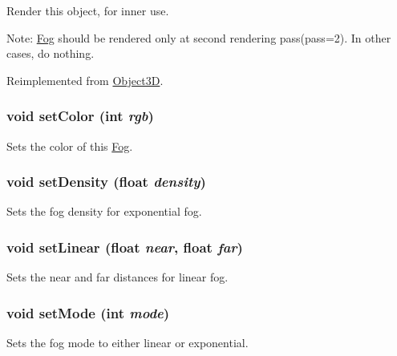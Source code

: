 Render this object, for inner use.

Note: \hyperlink{classm3g_1_1Fog}{Fog} should be rendered only at second rendering pass(pass=2). In other cases, do nothing. 

Reimplemented from \hyperlink{classm3g_1_1Object3D_1efcb1973989d9963d5bd6d03065d389}{Object3D}.\hypertarget{classm3g_1_1Fog_b1f5cc0f5cc6bbbd716a526c61f1081d}{
\subsubsection[{setColor}]{\setlength{\rightskip}{0pt plus 5cm}void setColor (int {\em rgb})}}
\label{classm3g_1_1Fog_b1f5cc0f5cc6bbbd716a526c61f1081d}


Sets the color of this \hyperlink{classm3g_1_1Fog}{Fog}. \hypertarget{classm3g_1_1Fog_0ceeda25e326e99d6e971e980a00bd49}{
\subsubsection[{setDensity}]{\setlength{\rightskip}{0pt plus 5cm}void setDensity (float {\em density})}}
\label{classm3g_1_1Fog_0ceeda25e326e99d6e971e980a00bd49}


Sets the fog density for exponential fog. \hypertarget{classm3g_1_1Fog_a46fd556865ae7f1c683c3741b68c168}{
\subsubsection[{setLinear}]{\setlength{\rightskip}{0pt plus 5cm}void setLinear (float {\em near}, \/  float {\em far})}}
\label{classm3g_1_1Fog_a46fd556865ae7f1c683c3741b68c168}


Sets the near and far distances for linear fog. \hypertarget{classm3g_1_1Fog_9f407b18ba6235cb96fa95611c1ea3a4}{
\subsubsection[{setMode}]{\setlength{\rightskip}{0pt plus 5cm}void setMode (int {\em mode})}}
\label{classm3g_1_1Fog_9f407b18ba6235cb96fa95611c1ea3a4}


Sets the fog mode to either linear or exponential. 

